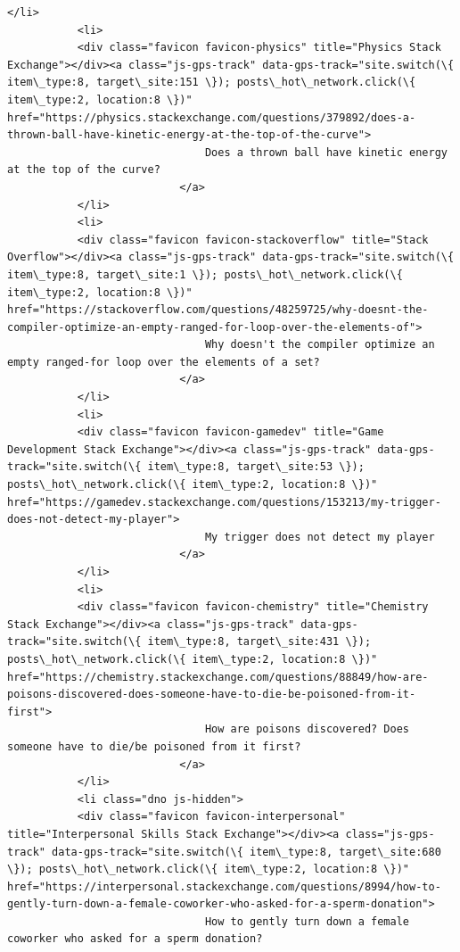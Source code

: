 \documentclass[11pt]{article}
\begin{document}
\begin{Verbatim}[commandchars=\\\{\}]
           </li>
           <li>
           <div class="favicon favicon-physics" title="Physics Stack Exchange"></div><a class="js-gps-track" data-gps-track="site.switch(\{ item\_type:8, target\_site:151 \}); posts\_hot\_network.click(\{ item\_type:2, location:8 \})" href="https://physics.stackexchange.com/questions/379892/does-a-thrown-ball-have-kinetic-energy-at-the-top-of-the-curve">
                               Does a thrown ball have kinetic energy at the top of the curve?
                           </a>
           </li>
           <li>
           <div class="favicon favicon-stackoverflow" title="Stack Overflow"></div><a class="js-gps-track" data-gps-track="site.switch(\{ item\_type:8, target\_site:1 \}); posts\_hot\_network.click(\{ item\_type:2, location:8 \})" href="https://stackoverflow.com/questions/48259725/why-doesnt-the-compiler-optimize-an-empty-ranged-for-loop-over-the-elements-of">
                               Why doesn't the compiler optimize an empty ranged-for loop over the elements of a set?
                           </a>
           </li>
           <li>
           <div class="favicon favicon-gamedev" title="Game Development Stack Exchange"></div><a class="js-gps-track" data-gps-track="site.switch(\{ item\_type:8, target\_site:53 \}); posts\_hot\_network.click(\{ item\_type:2, location:8 \})" href="https://gamedev.stackexchange.com/questions/153213/my-trigger-does-not-detect-my-player">
                               My trigger does not detect my player
                           </a>
           </li>
           <li>
           <div class="favicon favicon-chemistry" title="Chemistry Stack Exchange"></div><a class="js-gps-track" data-gps-track="site.switch(\{ item\_type:8, target\_site:431 \}); posts\_hot\_network.click(\{ item\_type:2, location:8 \})" href="https://chemistry.stackexchange.com/questions/88849/how-are-poisons-discovered-does-someone-have-to-die-be-poisoned-from-it-first">
                               How are poisons discovered? Does someone have to die/be poisoned from it first?
                           </a>
           </li>
           <li class="dno js-hidden">
           <div class="favicon favicon-interpersonal" title="Interpersonal Skills Stack Exchange"></div><a class="js-gps-track" data-gps-track="site.switch(\{ item\_type:8, target\_site:680 \}); posts\_hot\_network.click(\{ item\_type:2, location:8 \})" href="https://interpersonal.stackexchange.com/questions/8994/how-to-gently-turn-down-a-female-coworker-who-asked-for-a-sperm-donation">
                               How to gently turn down a female coworker who asked for a sperm donation?

\end{Verbatim}
\end{document}

